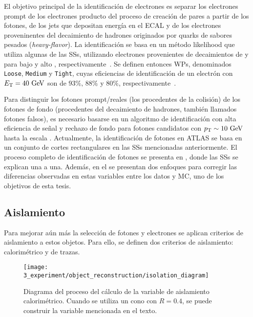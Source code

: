 El objetivo principal de la identificación de electrones es separar los electrones prompt de los electrones producto del proceso de creación de pares a partir de los fotones, de los jets que depositan energía en el \ac{ECAL} y de los electrones proveninentes del decaimiento de hadrones originados por quarks de sabores pesados (\textit{heavy-flavor}). La identificación se basa en un método likelihood que utiliza algunas de las \acp{SS}, utilizando electrones provenientes de decaimientos de \jpsi y \Zboson para bajo y alto \et, respectivamente~\cite{ATLAS-EGamma-Performance-2024}. Se definen entonces \acp{WP}, denominados \texttt{Loose}, \texttt{Medium} y \texttt{Tight}, cuyas eficiencias de identificación de un electrón con \(E_{\text{T}}=40~\text{GeV}\) son de \(93\%, \, 88\%\) y \(80\%\), respectivamente~\cite{ATLAS-EGamma-Calibration-2015-2016}.


Para distinguir los fotones prompt/reales (los procedentes de la colisión) de los fotones de fondo (procedentes del decaimiento de hadrones, también llamados fotones falsos), es necesario basarse en un algoritmo de identificación con alta eficiencia de señal y rechazo de fondo para fotones candidatos con \(p_{\text{T}} \sim 10~\text{GeV}\) hasta la escala \tev.
Actualmente, la identificación de fotones en \ac{ATLAS} se basa en un conjunto de cortes rectangulares en las \acp{SS} mencionadas anteriormente.
El proceso completo de identificación de fotones se presenta en \Ch{\ref{ch:pid_ss}}, donde las \acp{SS} se explican una a una. Además, en el \Ch{\ref{ch:ss_corrections}} se presentan dos enfoques para corregir las diferencias observadas en estas variables entre los datos y \ac{MC}, uno de los objetivos de esta tesis.





\subsection{Aislamiento}
\label{subsec:objects:egamma:iso}

Para mejorar aún más la selección de fotones y electrones se aplican criterios de aislamiento a estos objetos. Para ello, se definen dos criterios de aislamiento: calorimétrico y de trazas. 

\begin{figure}[ht!]
    \centering
    \texttt{[image: 3\_experiment/object\_reconstruction/isolation\_diagram]}
    \caption{Diagrama del proceso del cálculo de la variable de aislamiento calorimétrico. Cuando se utiliza un cono con \(R=0.4\), se puede construir la variable \etconefo mencionada en el texto.}
    \label{fig:objects:egamma:iso:iso_diagram}
\end{figure}

